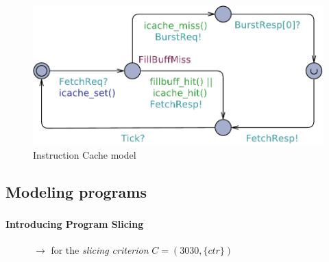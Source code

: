 \documentclass[usenames,dvipsnames]{beamer}
\begin{document}
  \begin{frame}
    \frametitle{\subsecname}
    \framesubtitle{~}

    \begin{figure}
      \centering
      \includegraphics[scale=.45]{fig/icache}
      \caption{Instruction Cache model}
    \end{figure}
  \end{frame}

  \subsection{Modeling programs}
  \begin{frame}
    \frametitle{\subsecname}
    \framesubtitle{Introducing Program Slicing}

    \begin{figure}
      \centering
      \begin{overlayarea}{\textwidth}{\textheight}
        \begin{center}
          $\rightarrow$ for the \emph{slicing criterion} $C = ( 3030, \{ctr\} )$
        \end{center}
      \end{overlayarea}
    \end{figure}
  \end{frame}
\end{document}

